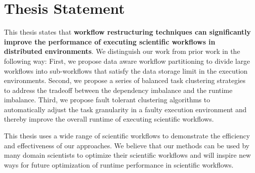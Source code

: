 

\section{Thesis Statement}
This thesis states that \textbf{workflow restructuring techniques can significantly improve the performance of executing scientific workflows in distributed environments}. We distinguish our work from prior work in the following way: First, we propose data aware workflow partitioning to divide large workflows into sub-workflows that satisfy the data storage limit in the execution environments. Second, we propose a series of balanced task clustering strategies to address the tradeoff between the dependency imbalance and the runtime imbalance. Third, we propose fault tolerant clustering algorithms to automatically adjust the task granularity in a faulty execution environment and thereby improve the overall runtime of executing scientific workflows. 

This thesis uses a wide range of scientific workflows to demonstrate the efficiency and effectiveness of our approaches. 
We believe that our methods can be used by many domain scientists to optimize their scientific workflows and will inspire new ways for future optimization of runtime performance in scientific workflows. 



